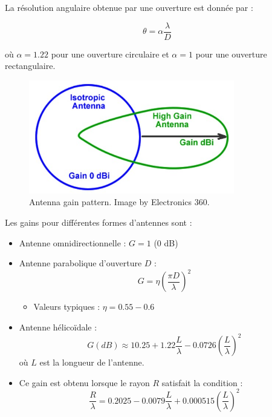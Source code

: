 La résolution angulaire obtenue par une ouverture est donnée par :

\begin{equation}
    \theta = \alpha \frac{\lambda}{D}
\end{equation}

où $\alpha = 1.22$ pour une ouverture circulaire et $\alpha = 1$ pour une ouverture rectangulaire.

\begin{figure}[H] %
    \centering
    \includegraphics[width=0.8\textwidth]{figures/6-52.jpg}
    
    \caption{Antenna gain pattern. Image by Electronics 360.}
    \label{fig:communication2}
\end{figure}


Les gains pour différentes formes d'antennes sont :

\begin{itemize}
    \item Antenne omnidirectionnelle : $G = 1$ (0 dB)
    \item Antenne parabolique d’ouverture $D$ : 
    \begin{equation}
        G = \eta \left(\frac{\pi D}{\lambda}\right)^2
    \end{equation}
    \begin{itemize}
        \item Valeurs typiques : $\eta = 0.55 - 0.6$
    \end{itemize}
    \item Antenne hélicoïdale :
    \begin{equation}
        G(dB) \approx 10.25 + 1.22 \frac{L}{\lambda} - 0.0726 \left(\frac{L}{\lambda}\right)^2
    \end{equation}
    où $L$ est la longueur de l’antenne.
    
    \item Ce gain est obtenu lorsque le rayon $R$ satisfait la condition :
    \begin{equation}
        \frac{R}{\lambda} = 0.2025 - 0.0079 \frac{L}{\lambda} + 0.000515 \left(\frac{L}{\lambda}\right)^2
    \end{equation}
\end{itemize}

